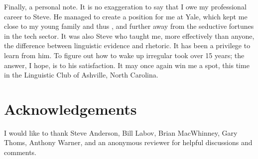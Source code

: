 \documentclass[output=paper,
modfonts
]{LSP/langsci}
\begin{document}
\enlargethispage*{1cm}Finally, a personal note. It is no exaggeration to say that I owe my
professional career to Steve. He 
managed to create a position for
me at Yale, which  kept me close 
to my young family and thus , and further away from the
seductive fortunes in  the tech sector. It was also Steve who taught
me, more effectively than anyone, the difference between linguistic  
evidence and rhetoric. It has been a privilege to learn from him.  To figure  out  how to wake up irregular took over 15 years; the 
answer, I hope, is to  his satisfaction. It may once again win 
me a spot, this time in the Linguistic Club of
Ashville, North Carolina. 



\section*{Acknowledgements}
I would like to thank Steve Anderson, Bill
    Labov, Brian MacWhinney,  Gary Thoms, Anthony Warner, and an
    anonymous reviewer for helpful discussions and comments.

{\sloppy
\printbibliography[heading=subbibliography,notkeyword=this]
}
\end{document}
